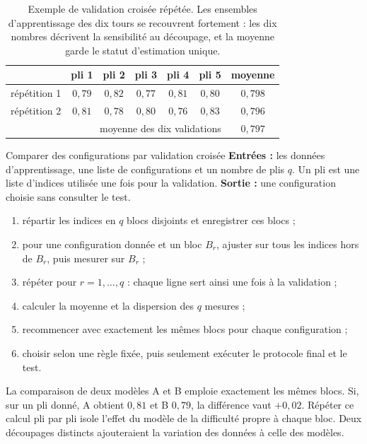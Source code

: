 \begin{table}[htbp]
\centering
\begin{tabular}{lccccc|c}
\toprule
& pli 1 & pli 2 & pli 3 & pli 4 & pli 5 & moyenne \\
\midrule
répétition 1 & $0{,}79$ & $0{,}82$ & $0{,}77$ & $0{,}81$ & $0{,}80$ & $0{,}798$ \\
répétition 2 & $0{,}81$ & $0{,}78$ & $0{,}80$ & $0{,}76$ & $0{,}83$ & $0{,}796$ \\
\midrule
\multicolumn{6}{r}{moyenne des dix validations} & $0{,}797$ \\
\bottomrule
\end{tabular}
\caption{Exemple de validation croisée répétée. Les ensembles d'apprentissage des
dix tours se recouvrent fortement : les dix nombres décrivent la sensibilité au
découpage, et la moyenne garde le statut d'estimation unique.}
\label{tab:repeated-cv}
\end{table}

\begin{procedure}{Comparer des configurations par validation croisée}
\textbf{Entrées :} les données d'apprentissage, une liste de configurations et
un nombre de plis $q$. Un pli est une liste d'indices utilisée une fois pour la
validation. \textbf{Sortie :} une configuration choisie sans consulter le test.
\begin{enumerate}
  \item répartir les indices en $q$ blocs disjoints et enregistrer ces blocs ;
  \item pour une configuration donnée et un bloc $B_r$, ajuster sur tous les
        indices hors de $B_r$, puis mesurer sur $B_r$ ;
  \item répéter pour $r=1,\ldots,q$ : chaque ligne sert ainsi une fois à la validation ;
  \item calculer la moyenne et la dispersion des $q$ mesures ;
  \item recommencer avec exactement les mêmes blocs pour chaque configuration ;
  \item choisir selon une règle fixée, puis seulement exécuter le protocole final et le test.
\end{enumerate}
\end{procedure}

La comparaison de deux modèles A et B emploie exactement les mêmes blocs. Si, sur
un pli donné, A obtient $0{,}81$ et B $0{,}79$, la différence vaut $+0{,}02$.
Répéter ce calcul pli par pli isole l'effet du modèle de la difficulté propre à
chaque bloc. Deux découpages distincts ajouteraient la variation des données à
celle des modèles.

